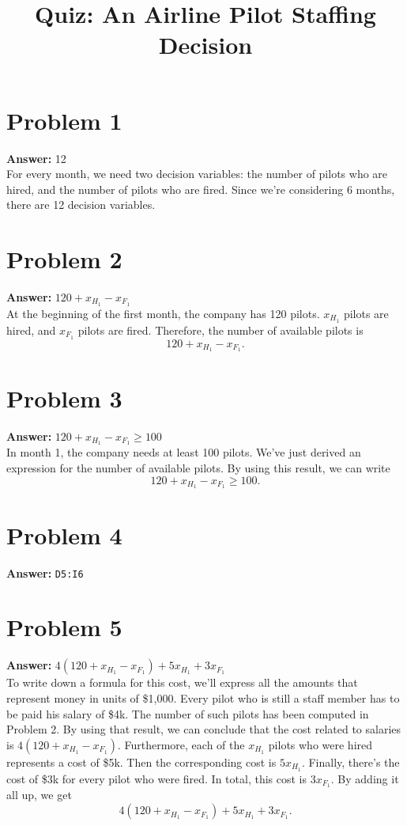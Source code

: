 \documentclass[11pt]{article}
\date{}
\title{Quiz: An Airline Pilot Staffing Decision}
\begin{document}
\thispagestyle{empty}
\pagestyle{empty}
\section*{Problem 1}
\label{sec:org3690d84}

\textbf{Answer:} 12\\

For every month, we need two decision variables: the number of pilots who are
hired, and the number of pilots who are fired. Since we're considering 6
months, there are 12 decision variables.
\section*{Problem 2}
\label{sec:org1a210ee}

\textbf{Answer:} \(120+x_{H_1}-x_{F_1}\)\\

At the beginning of the first month, the company has 120 pilots. \(x_{H_1}\)
pilots are hired, and \(x_{F_1}\) pilots are fired. Therefore, the number of
available pilots is
\begin{equation*}
120+x_{H_1}-x_{F_1}.
\end{equation*}
\section*{Problem 3}
\label{sec:org751edc1}

\textbf{Answer:} \(120+x_{H_1}-x_{F_1}\geq 100\)\\

In month 1, the company needs at least 100 pilots. We've just derived an
expression for the number of available pilots. By using this result, we can
write
\begin{equation}
120+x_{H_1}-x_{F_1}\geq 100.
\end{equation}
\section*{Problem 4}
\label{sec:orga864a00}

\textbf{Answer:} \texttt{D5:I6}
\section*{Problem 5}
\label{sec:org8821e3b}

\textbf{Answer:} \(4(120+x_{H_1}-x_{F_1})+5x_{H_1}+3x_{F_1}\)\\

To write down a formula for this cost, we'll express all the amounts that
represent money in units of \$1,000. Every pilot who is still a staff member has
to be paid his salary of \$4k. The number of such pilots has been computed in
Problem 2. By using that result, we can conclude that the cost related to
salaries is \(4(120+x_{H_1}-x_{F_1})\). Furthermore, each of the \(x_{H_1}\)
pilots who were hired represents a cost of \$5k. Then the corresponding cost is
\(5x_{H_1}\). Finally, there's the cost of \$3k for every pilot who were fired.
In total, this cost is \(3x_{F_1}\). By adding it all up, we get
\begin{equation*}
4(120+x_{H_1}-x_{F_1})+5x_{H_1}+3x_{F_1}.
\end{equation*}
\end{document}
